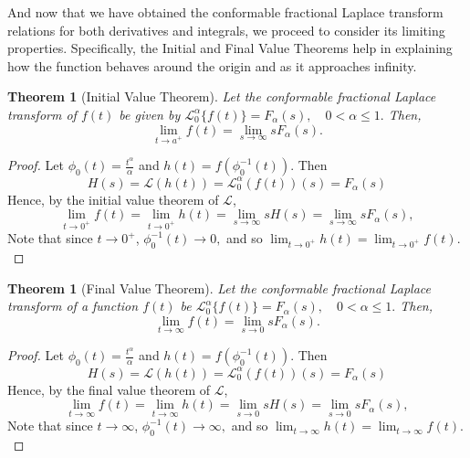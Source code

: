 \documentclass[two side,reqno,12pt]{amsart}
\numberwithin{equation}{section}
\newtheorem{theorem}[lemma]{Theorem}
\theoremstyle{definition}
\begin{document}
And now that we have obtained the conformable fractional Laplace transform relations for both derivatives and integrals, we proceed to consider its limiting properties. Specifically, the Initial and Final Value Theorems help in explaining how the function behaves around the origin and as it approaches infinity.
\begin{theorem}[Initial Value Theorem]
   Let the conformable fractional Laplace transform of 
$f(t)$ be given by 
\( \mathcal{L}_0^{\alpha}\{f(t)\} = F_{\alpha}(s), \quad 0 < \alpha \leq 1.
\)
Then,
\[
\lim_{t \to a^+} f(t) = \lim_{s \to \infty} s F_{\alpha}(s).
\]
\end{theorem}
\begin{proof}
Let $\phi_0(t)=\frac{t^{\alpha}}{\alpha}$ and $h(t)=f(\phi_0^{-1}(t))$. Then 
\[ H(s)=\mathcal{L}(h(t))=\mathcal L_0^{\alpha}(f(t))(s)=F_{\alpha}(s)\]
Hence, by the initial value theorem of $\mathcal L$,
\[
\lim_{t \to 0^+} f(t)=\lim_{t \to 0^+} h(t) = \lim_{s \to \infty} s H(s)=\lim_{s \to \infty} s F_{\alpha}(s),
\]
Note that since \( t \to 0^+ \), \(\phi_0^{-1}(t) \to 0,\) and so
$\displaystyle
\lim_{t \to 0^+} h(t) = \lim_{t \to 0^+} f(t).
$
\end{proof}
\begin{theorem}[Final Value Theorem]
   Let the conformable fractional Laplace transform of a function 
$
f(t)$ be
\(
\mathcal{L}_0^{\alpha}\{f(t)\} = F_{\alpha}(s), \quad 0 < \alpha \leq 1.
\)
Then,
\[
\lim_{t \to \infty} f(t) = \lim_{s \to 0} s F_{\alpha}(s).
\]
\end{theorem}
\begin{proof}
Let $\phi_0(t)=\frac{t^{\alpha}}{\alpha}$ and $h(t)=f(\phi_0^{-1}(t))$. Then 
\[ H(s)=\mathcal{L}(h(t))=\mathcal L_0^{\alpha}(f(t))(s)=F_{\alpha}(s)\]
Hence, by the final value theorem of $\mathcal L$,
\[
\lim_{t \to \infty} f(t)=\lim_{t \to \infty} h(t) = \lim_{s \to 0} s H(s)=\lim_{s \to 0} s F_{\alpha}(s),
\]
Note that since \( t \to \infty \), \(\phi_0^{-1}(t) \to \infty,\) and so
$\displaystyle
\lim_{t \to \infty} h(t) = \lim_{t \to \infty} f(t).
$
\end{proof}
\end{document}

